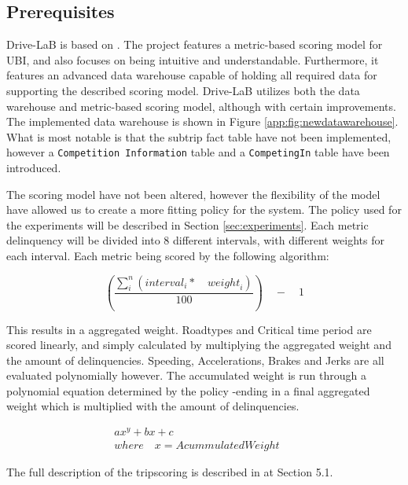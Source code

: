 \subsection{Prerequisites}\label{subsec:prereq}
Drive-LaB is based on \citep{sw9_report}. The project features a metric-based scoring model for UBI, and also focuses on being intuitive and understandable. Furthermore, it features an advanced data warehouse capable of holding all required data for supporting the described scoring model. Drive-LaB utilizes both the data warehouse and metric-based scoring model, although with certain improvements. The implemented data warehouse is shown in Figure \ref{app:fig:newdatawarehouse}. What is most notable is that the subtrip fact table have not been implemented, however a \texttt{Competition Information} table and a \texttt{CompetingIn} table have been introduced.

The scoring model have not been altered, however the flexibility of the model have allowed us to create a more fitting policy for the system. The policy used for the experiments will be described in Section \ref{sec:experiments}. Each metric delinquency will be divided into 8 different intervals, with different weights for each interval. Each metric being scored by the following algorithm:

$$
\left( \frac { \sum _{ i }^{ n }{ \left( { interval }_{ i }*\quad { weight }_{ i } \right)  }  }{ 100 }  \right) \quad -\quad 1
$$

This results in a aggregated weight. Roadtypes and Critical time period are scored linearly, and simply calculated by multiplying the aggregated weight and the amount of delinquencies. Speeding, Accelerations, Brakes and Jerks are all evaluated polynomially however. The accumulated weight is run through a polynomial equation determined by the policy -ending in a final aggregated weight which is multiplied with the amount of delinquencies.

\begin{align*}
ax^{y} + bx + c\quad \quad \quad \quad \quad \quad \quad \quad \quad \quad \quad \\
where\quad x = AcummulatedWeight
\end{align*}

The full description of the tripscoring is described in \citep{sw9_report} at Section 5.1.
